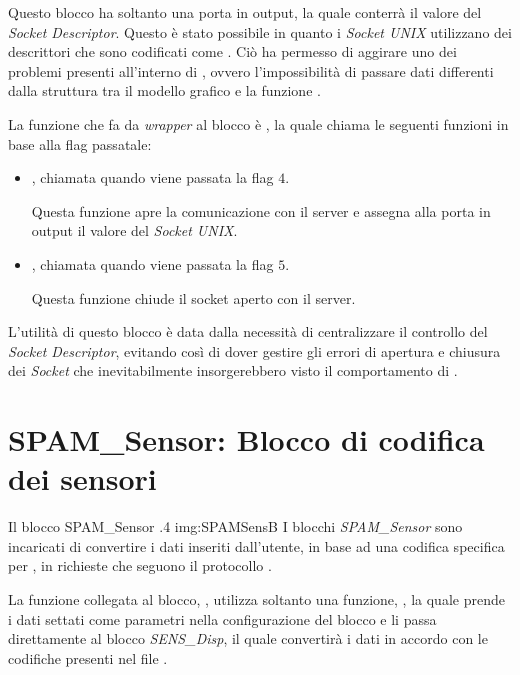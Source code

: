 Questo blocco ha soltanto una porta in output, la quale conterrà il valore
del \emph{Socket Descriptor}. Questo è stato possibile in quanto i
\emph{Socket UNIX} utilizzano dei descrittori che sono codificati come
. Ciò ha permesso di aggirare uno dei problemi presenti
all'interno di \SciCos{}, ovvero l'impossibilità di passare dati differenti
dalla struttura  tra il modello grafico e la
funzione .

La funzione che fa da \emph{wrapper} al blocco è \linebreak {}, la quale chiama le seguenti
funzioni in base alla flag passatale:
\begin{itemize}
    \item {}, chiamata quando
        viene passata la flag $4$. 

        Questa funzione apre la comunicazione con il server e assegna alla
        porta in output il valore del \emph{Socket UNIX}.
    \item {}, chiamata quando
        viene passata la flag $5$.

        Questa funzione chiude il socket aperto con il server.
\end{itemize}

L'utilità di questo blocco è data dalla necessità di centralizzare il
controllo del \emph{Socket Descriptor}, evitando così di dover gestire gli
errori di apertura e chiusura dei \emph{Socket} che inevitabilmente
insorgerebbero visto il comportamento di \SciCos{}.

\section[SPAM\_Sensor]{SPAM\_Sensor: Blocco di codifica dei sensori}
        {Il blocco SPAM\_Sensor}
        {.4}
        {img:SPAMSensB}
I blocchi \emph{SPAM\_Sensor} sono incaricati di convertire i dati inseriti
dall'utente, in base ad una codifica specifica per \SciCos{}, in richieste
che seguono il protocollo \BROFist{}.

La funzione collegata al blocco, , utilizza soltanto una funzione, , la quale prende i dati settati come
parametri nella configurazione del blocco e li passa direttamente al blocco
\emph{SENS\_Disp}, il quale convertirà i dati in accordo con le codifiche
presenti nel file .

